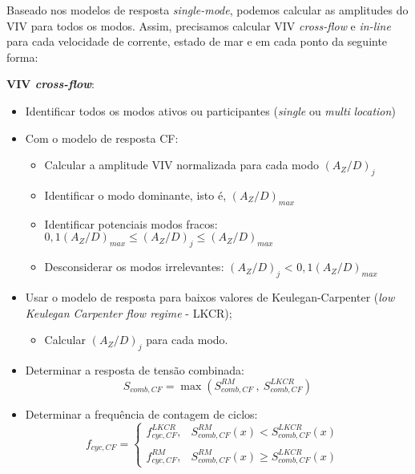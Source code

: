 Baseado nos modelos de resposta \textit{single-mode}, podemos calcular as amplitudes do VIV para todos os modos. Assim, precisamos calcular VIV \textit{cross-flow} e \textit{in-line} para cada velocidade de corrente, estado de mar e em cada ponto da seguinte forma:

\textbf{VIV \textit{cross-flow}}:
\begin{itemize}
\item Identificar todos os modos ativos ou participantes (\textit{single} ou \textit{multi} \textit{location})
\item Com o modelo de resposta CF:
	\begin{itemize}
    \item Calcular a amplitude VIV normalizada para cada modo $(A_Z/D)_j$
    
	\item Identificar o modo dominante, isto é, $(A_Z/D)_\mathit{max}$
	
    \item Identificar potenciais modos fracos: $0,1(A_Z/D)_\mathit{max} \leq (A_Z/D)_j \leq (A_Z/D)_\mathit{max}$
    
    \item Desconsiderar os modos irrelevantes: $(A_Z/D)_j$ < $0,1(A_Z/D)_\mathit{max}$
    \end{itemize}
\item Usar o modelo de resposta para baixos valores de Keulegan-Carpenter (\textit{low Keulegan Carpenter flow regime} - LKCR);
	\begin{itemize}
	\item Calcular $(A_Z/D)_j$ para cada modo.
	\end{itemize}
\item Determinar a resposta de tensão combinada: \\
\[ S_{\mathit{comb}, \mathit{CF}} = \max\left( S_{\mathit{comb}, \mathit{CF}}^\mathit{RM} ~,~ S_{\mathit{comb}, \mathit{CF}}^\mathit{LKCR} \right) \]

\item Determinar a frequência de contagem de ciclos: \\
\[f_{\mathit{cyc}, \mathit{CF}} = 
\left\{
\begin{matrix} 
f_{\mathit{cyc}, \mathit{CF}}^\mathit{LKCR}, & S_{\mathit{comb},\mathit{CF}}^\mathit{RM}(x)    < S_{\mathit{comb},\mathit{CF}}^\mathit{LKCR}(x) & \\
\\ 
f_{\mathit{cyc}, \mathit{CF}}^\mathit{RM},   & S_{\mathit{comb},\mathit{CF}}^\mathit{RM}(x) \geq S_{\mathit{comb},\mathit{CF}}^\mathit{LKCR}(x) 
\end{matrix}
\right.\]
\end{itemize}

